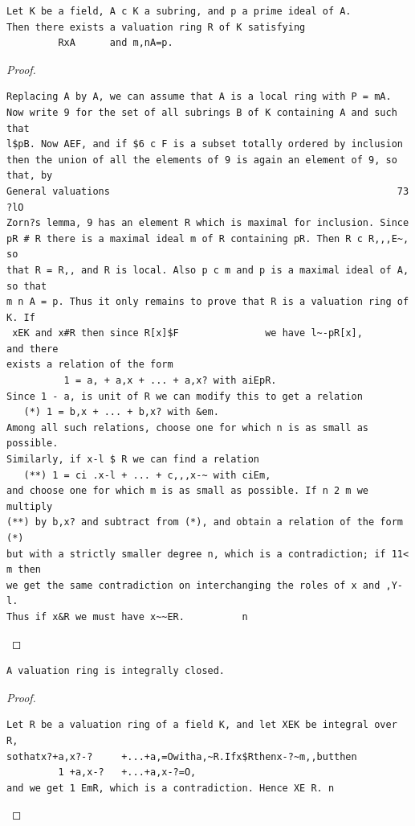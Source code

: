 \begin{theorem}\label{mcrt-auto-theorem-10-2}\uses{}
\begin{verbatim}
Let K be a field, A c K a subring, and p a prime ideal of A.
Then there exists a valuation ring R of K satisfying
         RxA      and m,nA=p.
\end{verbatim}
\end{theorem}
\begin{proof}
\begin{verbatim}
Replacing A by A, we can assume that A is a local ring with P = mA.
Now write 9 for the set of all subrings B of K containing A and such that
l$pB. Now AEF, and if $6 c F is a subset totally ordered by inclusion
then the union of all the elements of 9 is again an element of 9, so that, by
General valuations                                                  73
?lO
Zorn?s lemma, 9 has an element R which is maximal for inclusion. Since
pR # R there is a maximal ideal m of R containing pR. Then R c R,,,E~, so
that R = R,, and R is local. Also p c m and p is a maximal ideal of A, so that
m n A = p. Thus it only remains to prove that R is a valuation ring of K. If
 xEK and x#R then since R[x]$F               we have l~-pR[x],      and there
exists a relation of the form
          1 = a, + a,x + ... + a,x? with aiEpR.
Since 1 - a, is unit of R we can modify this to get a relation
   (*) 1 = b,x + ... + b,x? with &em.
Among all such relations, choose one for which n is as small as possible.
Similarly, if x-l $ R we can find a relation
   (**) 1 = ci .x-l + ... + c,,,x-~ with ciEm,
and choose one for which m is as small as possible. If n 2 m we multiply
(**) by b,x? and subtract from (*), and obtain a relation of the form (*)
but with a strictly smaller degree n, which is a contradiction; if 11< m then
we get the same contradiction on interchanging the roles of x and ,Y- l.
Thus if x&R we must have x~~ER.          n
\end{verbatim}
\end{proof}


\begin{theorem}\label{mcrt-auto-theorem-10-3}\uses{}
\begin{verbatim}
A valuation ring is integrally closed.
\end{verbatim}
\end{theorem}
\begin{proof}
\begin{verbatim}
Let R be a valuation ring of a field K, and let XEK be integral over R,
sothatx?+a,x?-?     +...+a,=Owitha,~R.Ifx$Rthenx-?~m,,butthen
         1 +a,x-?   +...+a,x-?=O,
and we get 1 EmR, which is a contradiction. Hence XE R. n
\end{verbatim}
\end{proof}


